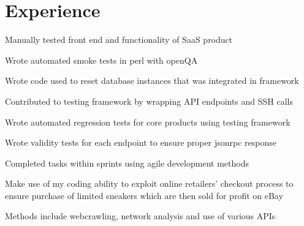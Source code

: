 \documentclass[]{deedy-resume-openfont}
\begin{document}
\begin{minipage}[t]{0.66\textwidth} 


\section{Experience}

\vspace{\topsep} %
\begin{tightemize}
\item Manually tested front end and functionality of SaaS product
\item Wrote automated smoke tests in perl with openQA
\item Wrote code used to reset database instances that was integrated in framework 
\item Contributed to testing framework by wrapping API endpoints and SSH calls
\item Wrote automated regression tests for core products using testing framework
\item Wrote validity tests for each endpoint to ensure proper jsonrpc response
\item Completed tasks within sprints using agile development methods
\end{tightemize}
\sectionsep

\begin{tightemize}
\item Make use of my coding ability to exploit online retailers’ checkout process to
ensure purchase of limited sneakers which are then sold for profit on eBay
\item Methods include webcrawling, network analysis and use of various APIs
\end{tightemize}
\sectionsep


\end{minipage}
\end{document}
